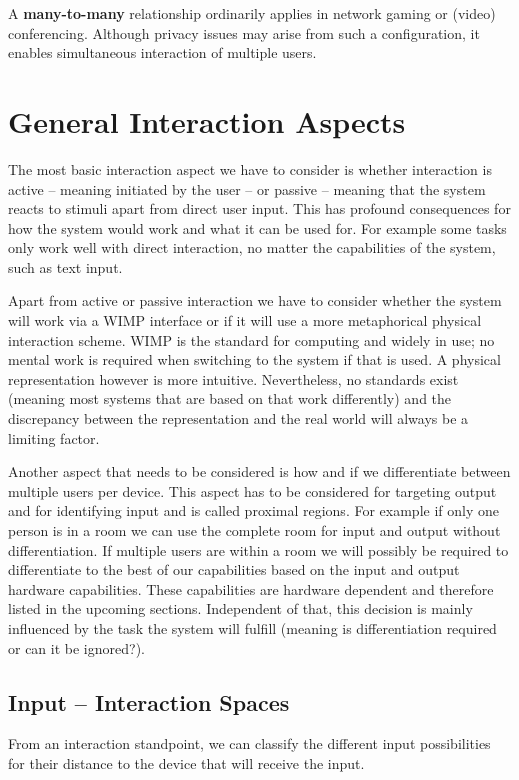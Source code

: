 \documentclass{acm_proc_article-sp}
\begin{document}
A \textbf{many-to-many} relationship ordinarily applies in network gaming or (video) conferencing. Although privacy issues may arise from such a configuration, it enables simultaneous interaction of multiple users.

\section{General Interaction Aspects}

The most basic interaction aspect we have to consider is whether interaction is active – meaning initiated by the user – or passive – meaning that the system reacts to stimuli apart from direct user input.
This has profound consequences for how the system would work and what it can be used for.
For example some tasks only work well with direct interaction, no matter the capabilities of the system, such as text input.

Apart from active or passive interaction we have to consider whether the system will work via a WIMP interface or if it will use a more metaphorical physical interaction scheme.
WIMP is the standard for computing and widely in use; no mental work is required when switching to the system if that is used.
A physical representation however is more intuitive.
Nevertheless, no standards exist (meaning most systems that are based on that work differently) and the discrepancy between the representation and the real world will always be a limiting factor.

Another aspect that needs to be considered is how and if we differentiate between multiple users per device.
This aspect has to be considered for targeting output and for identifying input and is called proximal regions.
For example if only one person is in a room we can use the complete room for input and output without differentiation.
If multiple users are within a room we will possibly be required to differentiate to the best of our capabilities based on the input and output hardware capabilities.
These capabilities are hardware dependent and therefore listed in the upcoming sections.
Independent of that, this decision is mainly influenced by the task the system will fulfill (meaning is differentiation required or can it be ignored?).

\subsection{Input – Interaction Spaces}

From an interaction standpoint, we can classify the different input possibilities for their distance to the device that will receive the input.
\end{document}

